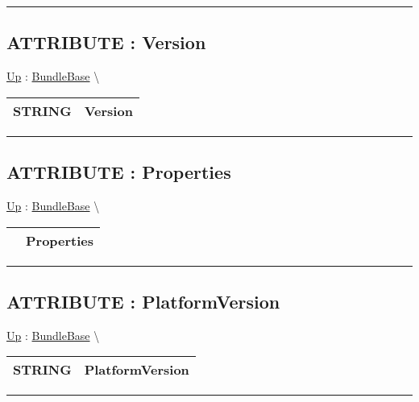 \par


\rule{\linewidth}{0.5pt}
\subsection*{ATTRIBUTE : Version}
\hypertarget{ecldoc:bundlebase.version}{}
\hyperlink{ecldoc:BundleBase}{Up} :
\hspace{0pt} \hyperlink{ecldoc:BundleBase}{BundleBase} \textbackslash 

{\renewcommand{\arraystretch}{1.5}
\begin{tabularx}{\textwidth}{|>{\raggedright\arraybackslash}l|X|}
\hline
\hspace{0pt}STRING & Version \\
\hline
\end{tabularx}
}

\par


\rule{\linewidth}{0.5pt}
\subsection*{ATTRIBUTE : Properties}
\hypertarget{ecldoc:bundlebase.properties}{}
\hyperlink{ecldoc:BundleBase}{Up} :
\hspace{0pt} \hyperlink{ecldoc:BundleBase}{BundleBase} \textbackslash 

{\renewcommand{\arraystretch}{1.5}
\begin{tabularx}{\textwidth}{|>{\raggedright\arraybackslash}l|X|}
\hline
\hspace{0pt} & Properties \\
\hline
\end{tabularx}
}

\par


\rule{\linewidth}{0.5pt}
\subsection*{ATTRIBUTE : PlatformVersion}
\hypertarget{ecldoc:bundlebase.platformversion}{}
\hyperlink{ecldoc:BundleBase}{Up} :
\hspace{0pt} \hyperlink{ecldoc:BundleBase}{BundleBase} \textbackslash 

{\renewcommand{\arraystretch}{1.5}
\begin{tabularx}{\textwidth}{|>{\raggedright\arraybackslash}l|X|}
\hline
\hspace{0pt}STRING & PlatformVersion \\
\hline
\end{tabularx}
}

\par


\rule{\linewidth}{0.5pt}


